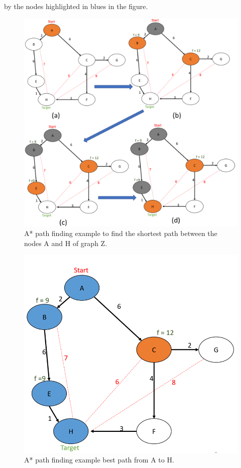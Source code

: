 by the nodes highlighted in blues in the figure.

\begin{figure}[!ht]
    \centering
    \includegraphics[width = \linewidth]{figs/A8/A_STAR_EXAMPLE.png}
    \caption{A* path finding example to find the shortest path between the nodes A and H of graph Z.}
    \label{fig:A_STAR_EXAMPLE}
\end{figure}


\begin{figure}[!ht]
    \centering
    \includegraphics[width = 0.5\linewidth]{figs/A8/A_STAR_EXAMPLE_2.png}
    \caption{A* path finding example best path from A to H.}
    \label{fig:A_STAR_EXAMPLE_2}
\end{figure}


